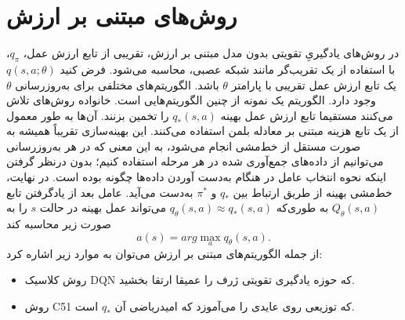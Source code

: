 \section{روش‌های مبتنی بر ارزش}


در روش‌های یادگیریِ تقویتی بدون مدل مبتنی بر ارزش،
تقریبی از تابع ارزش عمل، $q_\pi$،
 با استفاده از  یک تقریب‌گر
 مانند شبکه عصبی، محاسبه می‌شود. فرض کنید
$q(s,a;\theta)$
یک تابع ارزش عمل تقریبی با پارامتر  
$\theta$ 
باشد.
الگوریتم‌های مختلفی برای به‌روزرسانی $\theta$ وجود دارد.
الگوریتم 
  یک نمونه از چنین الگوریتم‌هایی ‌است.
  خانواده روش‌های 
    تلاش می‌کنند مستقیما تابع ارزش عمل بهینه $q_*(s,a)$ را تخمین بزنند. آن‌ها به طور معمول از یک تابع هزینه مبتنی بر معادله بلمن استفاده می‌کنند. این بهینه‌سازی تقریباً همیشه به صورت مستقل از خط‌مشی انجام می‌شود، به این معنی که در هر به‌روزرسانی می‌توانیم از داده‌های جمع‌آوری شده در هر مرحله استفاده کنیم؛ بدون  درنظر گرفتن اینکه نحوه انتخاب عامل در هنگام به‌دست آوردن داده‌ها چگونه بوده است.  در نهایت، خط‌مشی بهینه از طریق ارتباط بین 
 $q_*$
  و
  $\pi^*$
  به‌دست می‌آید. 
  عامل بعد از یادگرفتن تابع $Q_\theta(s,a)$ به طوری‌که  $q_\theta(s,a) \approx q_*(s,a)$ می‌تواند عمل بهینه در حالت $s$ را به صورت زیر محاسبه کند $$a(s) = arg \max_a q_{\theta}(s,a).$$
  از جمله الگوریتم‌های مبتنی بر ارزش می‌توان به موارد زیر اشاره کرد:
  \begin{itemize}
  	\item روش کلاسیک DQN که حوزه یادگیری تقویتی ژرف را عمیقا ارتقا بخشید.
  	\item روش C51 که توزیعی روی عایدی را می‌آموزد که امیدریاضی آن $q_*$ است.
  \end{itemize}

